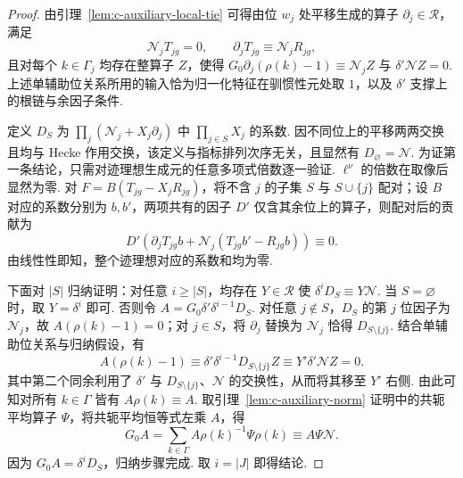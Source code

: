 \begin{proof}
由引理~\ref{lem:c-auxiliary-local-tie} 可得由位 $w_j$ 处平移生成的算子 $\partial_j\in\mathcal R$，满足
\[
 \mathcal N_jT_{jg}=0,\qquad
 \partial_jT_{jg}\equiv\mathcal N_jR_{jg},
\]
且对每个 $k\in\Gamma_j$ 均存在整算子 $Z$，使得 $G_0\partial_j(\rho(k)-1)\equiv\mathcal N_j Z$ 与 $\delta'\mathcal N Z=0$.
上述单辅助位关系所用的输入恰为归一化特征在驯惯性元处取 $1$，以及 $\delta'$ 支撑上的根链与余因子条件.

定义 $D_S$ 为 $\prod_j(\mathcal N_j+X_j\partial_j)$ 中 $\prod_{j\in S}X_j$ 的系数.
因不同位上的平移两两交换且均与 Hecke 作用交换，该定义与指标排列次序无关，且显然有 $D_\varnothing=\mathcal N$.
为证第一条结论，只需对迹理想生成元的任意多项式倍数逐一验证.
$\ell^\nu$ 的倍数在取像后显然为零.
对 $F=B(T_{jg}-X_jR_{jg})$，将不含 $j$ 的子集 $S$ 与 $S\cup\{j\}$ 配对；设 $B$ 对应的系数分别为 $b,b'$，两项共有的因子 $D'$ 仅含其余位上的算子，则配对后的贡献为
\[
 D'\left(\partial_j T_{jg}b
        +\mathcal N_j(T_{jg}b'-R_{jg}b)\right)\equiv 0.
\]
由线性性即知，整个迹理想对应的系数和均为零.

下面对 $|S|$ 归纳证明：对任意 $i\ge |S|$，均存在 $Y\in\mathcal R$ 使 $\delta^iD_S\equiv Y\mathcal N$.
当 $S=\varnothing$ 时，取 $Y=\delta^i$ 即可.
否则令 $A=G_0\delta'\delta^{i-1}D_S$.
对任意 $j\notin S$，$D_S$ 的第 $j$ 位因子为 $\mathcal N_j$，故 $A(\rho(k)-1)=0$；对 $j\in S$，将 $\partial_j$ 替换为 $\mathcal N_j$ 恰得 $D_{S\setminus\{j\}}$.
结合单辅助位关系与归纳假设，有
\[
 A(\rho(k)-1)
 \equiv\delta'\delta^{i-1}D_{S\setminus\{j\}}Z
 \equiv Y'\delta'\mathcal N Z=0 .
\]
其中第二个同余利用了 $\delta'$ 与 $D_{S\setminus\{j\}}$、$\mathcal N$ 的交换性，从而将其移至 $Y'$ 右侧.
由此可知对所有 $k\in\Gamma$ 皆有 $A\rho(k)\equiv A$.
取引理~\ref{lem:c-auxiliary-norm} 证明中的共轭平均算子 $\Psi$，将共轭平均恒等式左乘 $A$，得
\[
 G_0 A=\sum_{k\in\Gamma}A\rho(k)^{-1}\Psi\rho(k)
       \equiv A\Psi\mathcal N.
\]
因为 $G_0 A=\delta^iD_S$，归纳步骤完成. 取 $i=|J|$ 即得结论.
\end{proof}

